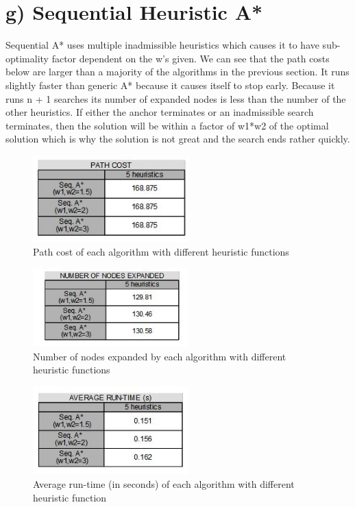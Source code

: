 \documentclass[a4paper]{article}
\begin{document}
\section*{g) Sequential Heuristic A*}
	Sequential A* uses multiple inadmissible heuristics which causes it to have sub-optimality factor dependent on the w's given. We can see that the path costs below are larger than a majority of the algorithms in the previous section. It runs slightly faster than generic A* because it causes itself to stop early. Because it runs n + 1 searches its number of expanded nodes is less than the number of the other heuristics. If either the anchor terminates or an inadmissible search terminates, then the solution will be within a factor of w1*w2 of the optimal solution which is why the solution is not great and the search ends rather quickly.

\begin{figure}[!h]
  \centering
  \includegraphics[width=60mm]{seqcost.JPG}
  \caption{\label{fig:Table1}Path cost of each algorithm with different heuristic functions}
  \end{figure}
  
  \begin{figure}[!ht]
  \centering
  \includegraphics[width=60mm]{seqnodes.JPG}
  \caption{\label{fig:Table2}Number of nodes expanded by each algorithm with different heuristic functions}
  \end{figure}
  
  \begin{figure}[!h]
  \centering
  \includegraphics[width=60mm]{seqrun.JPG}
  \caption{\label{Table3}Average run-time (in seconds) of each algorithm with different heuristic function}
  \end{figure}
\end{document}
